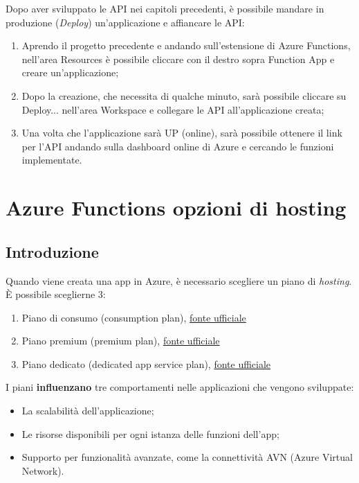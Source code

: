 \documentclass[a4paper]{article}
\begin{document}
	Dopo aver sviluppato le API nei capitoli precedenti, è possibile mandare in produzione (\emph{Deploy}) un'applicazione e affiancare le API:
	\begin{enumerate}
		\item Aprendo il progetto precedente e andando sull'estensione di Azure Functions, nell'area Resources è possibile cliccare con il destro sopra Function App e creare un'applicazione;
		
		\item Dopo la creazione, che necessita di qualche minuto, sarà possibile cliccare su \textsf{Deploy...} nell'area Workspace e collegare le API all'applicazione creata;
		
		\item Una volta che l'applicazione sarà UP (online), sarà possibile ottenere il link per l'API andando sulla dashboard online di Azure e cercando le funzioni implementate.
	\end{enumerate}\newpage
	
	\section{Azure Functions opzioni di hosting}
	
	\subsection{Introduzione}
	
	Quando viene creata una app in Azure, è necessario scegliere un piano di \emph{hosting}. È possibile sceglierne 3:
	\begin{enumerate}
		\item Piano di consumo (consumption plan), \href{https://learn.microsoft.com/en-gb/azure/azure-functions/consumption-plan}{fonte ufficiale}
		
		\item Piano premium (premium plan), \href{https://learn.microsoft.com/en-gb/azure/azure-functions/functions-premium-plan}{fonte ufficiale}
		
		\item Piano dedicato (dedicated app service plan), \href{https://learn.microsoft.com/en-gb/azure/azure-functions/dedicated-plan}{fonte ufficiale}
	\end{enumerate}
	I piani \textbf{influenzano} tre comportamenti nelle applicazioni che vengono sviluppate:
	\begin{itemize}
		\item La scalabilità dell'applicazione;
		
		\item Le risorse disponibili per ogni istanza delle funzioni dell'app;
		
		\item Supporto per funzionalità avanzate, come la connettività AVN (Azure Virtual Network).
	\end{itemize}
	
\end{document}

